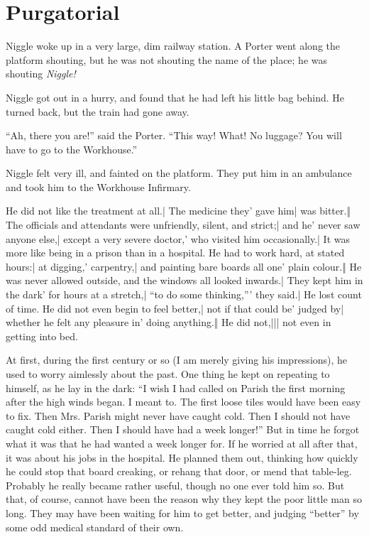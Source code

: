 \section*{Purgatorial}

Niggle woke up in a very large, dim railway station. A Porter went along the platform shouting, but he was not shouting the name of the place; he was shouting \emph{Niggle!}

Niggle got out in a hurry, and found that he had left his little bag behind. He turned back, but the train had gone away.

“Ah, there you are!” said the Porter. “This way! What! No luggage? You will have to go to the Workhouse.”

Niggle felt very ill, and fainted on the platform. They put him in an ambulance and took him to the Workhouse Infirmary.


\begin{itemize}
\halfone He did not like the treatment at all.| The medicine they' gave him| was bitter.‖ The officials and attendants were unfriendly, silent, and strict;| and he' never saw anyone else,| except a very severe doctor,' who visited him occasionally.| It was more like being in a prison than in a hospital.
\halftwo He had to work hard, at stated hours:| at digging,' carpentry,| and painting bare boards all one' plain colour.‖ He was never allowed outside, and the windows all looked inwards.| They kept him in the dark' for hours at a stretch,| “to do some thinking,”' they said.| He lost count of time.
\halftwo He did not even begin to feel better,| not if that could be' judged by| whether he felt any pleasure in' doing anything.‖ He did not,||| not even in getting into bed.
\end{itemize}

At first, during the first century or so (I am merely giving his impressions), he used to worry aimlessly about the past. One thing he kept on repeating to himself, as he lay in the dark: “I wish I had called on Parish the first morning after the high winds began. I meant to. The first loose tiles would have been easy to fix. Then Mrs. Parish might never have caught cold. Then I should not have caught cold either. Then I should have had a week longer!” But in time he forgot what it was that he had wanted a week longer for. If he worried at all after that, it was about his jobs in the hospital. He planned them out, thinking how quickly he could stop that board creaking, or rehang that door, or mend that table-leg. Probably he really became rather useful, though no one ever told him so. But that, of course, cannot have been the reason why they kept the poor little man so long. They may have been waiting for him to get better, and judging “better” by some odd medical standard of their own.

